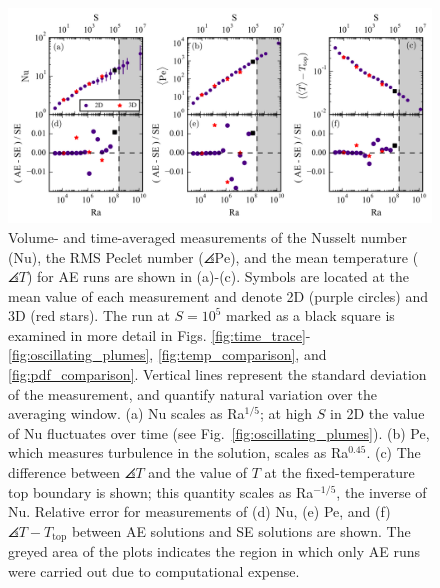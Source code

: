 \begin{figure}[ht!]
\vspace{-1.5cm}
\includegraphics[width=\textwidth]{./figs/parameter_space_comparison.pdf}
\caption[Parameter space comparison of AE and SE values]
{
	Volume- and time-averaged measurements of the Nusselt number (Nu), the RMS Peclet number ($\angles{\text{Pe}}$), and the mean temperature ($\angles{T}$) for AE runs are shown in (a)-(c).
	Symbols are located at the mean value of each measurement and denote 2D (purple circles) and 3D (red stars). 
	The run at $S = 10^5$ marked as a black square is examined in more detail in Figs. \ref{fig:time_trace}-\ref{fig:oscillating_plumes}, \ref{fig:temp_comparison}, and \ref{fig:pdf_comparison}.
	Vertical lines represent the standard deviation of the measurement, and quantify natural variation over the averaging window. 
	(a) Nu scales as Ra$^{1/5}$; at high $S$ in 2D the value of Nu fluctuates over time (see Fig.~\ref{fig:oscillating_plumes}).  
	(b) Pe, which measures turbulence in the solution, scales as Ra$^{0.45}$. 
	(c) The difference between $\angles{T}$ and the value of $T$ at the fixed-temperature top boundary is shown; this quantity scales as Ra$^{-1/5}$, the inverse of Nu. 
	Relative error for measurements of (d) Nu, (e) Pe, and (f) $\angles{T} - T_{\text{top}}$ between AE solutions and SE solutions are shown.
	The greyed area of the plots indicates the region in which only AE runs were carried out due to computational expense. 
	\label{fig:parameter_space_comparison} 
}
\end{figure}


